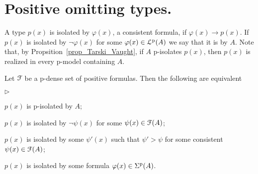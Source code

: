 \documentclass[10pt,oneside]{amsproc}
\newcommand{\mylabel}[1]{{#1}\hfill}
\renewenvironment{itemize}
  {\begin{list}{$\triangleright$}{%
  \setlength{\parskip}{0mm}
  \setlength{\topsep}{.4\baselineskip}
  \setlength{\rightmargin}{0mm}
  \setlength{\listparindent}{0mm}
  \setlength{\itemindent}{0mm}
  \setlength{\labelwidth}{3ex}
  \setlength{\itemsep}{.2\baselineskip}
  \setlength{\parsep}{.2\baselineskip}
  \setlength{\partopsep}{0mm}
  \setlength{\labelsep}{1ex}
  \setlength{\leftmargin}{\labelwidth+\labelsep}
  \let\makelabel\mylabel}}{%
\end{list}}
\renewcommand*{\emph}[1]{%
   \smash{\tikz[baseline]\node[rectangle, fill=teal!25, rounded corners, inner xsep=0.5ex, inner ysep=0.2ex, anchor=base, minimum height = 2.7ex]{\strut #1};}}
\begin{document}
{%







\section{Positive omitting types.}

\def\ceq#1#2#3{\parbox[t]{30ex}{$\displaystyle #1$}\parbox{4ex}{\hfil $#2$}{$\displaystyle #3$}}

A type $p(x)$ is isolated by $\varphi(x)$, a consistent formula, if $\varphi(x)\rightarrow p(x)$.
If $p(x)$ is isolated by $\neg\varphi(x)$ for some $\varphi(x)\in{\EuScript L}^{\rm p}(A)$ we say that it is \emph{p-isolated\/} by $A$.
Note that, by Propsition~\ref{prop_Tarski_Vaught}, if $A$ p-isolates $p(x)$, then $p(x)$ is realized in every p-model containing $A$.

\begin{fact}\label{fact_isolation}
  Let ${\EuScript F}$ be a p-dense set of positive formulas.
  Then the following are equivalent
\begin{itemize}
  \item[1.] $p(x)$ is p-isolated by $A$;
  \item[2.] $p(x)$ is isolated by $\neg\psi(x)$ for some $\psi(x)\in{\EuScript F}(A)$;
  \item[3.] $p(x)$ is isolated by some $\psi'(x)$ such that  $\psi'>\psi$ for some consistent $\psi(x)\in{\EuScript F}(A)$;
  \item[4.] $p(x)$ is isolated by some formula $\varphi(x)\in\Sigma^{\rm p}(A)$.
\end{itemize}
\end{fact}

}
\end{document}
